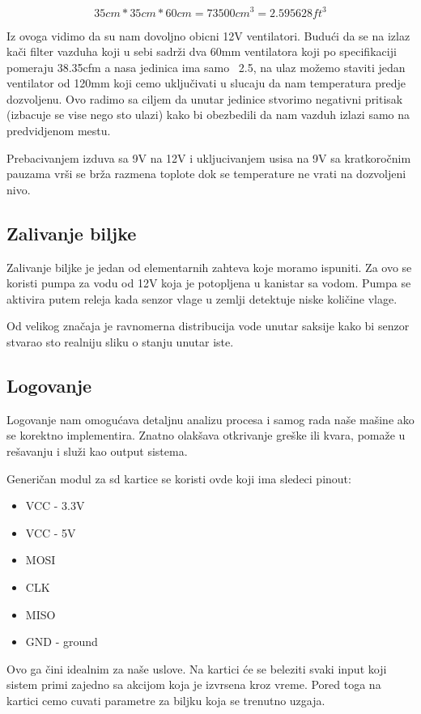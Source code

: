 \documentclass[a4paper,11pt]{book}
\begin{document}
\[ 35cm * 35cm * 60cm =  73500cm^3 = 2.595628ft^3\]

Iz ovoga vidimo da su nam dovoljno obicni 12V ventilatori. Budući da se na izlaz kači filter vazduha koji u sebi sadrži dva 60mm ventilatora koji po specifikaciji pomeraju 38.35cfm a nasa jedinica ima samo ~2.5, na ulaz možemo staviti jedan ventilator od 120mm koji cemo uključivati u slucaju da nam temperatura predje dozvoljenu. Ovo radimo sa ciljem da unutar jedinice stvorimo negativni pritisak (izbacuje se vise nego sto ulazi) kako bi obezbedili da nam vazduh izlazi samo na predvidjenom mestu.

\noindent Prebacivanjem izduva sa 9V na 12V i ukljucivanjem usisa na 9V sa kratkoročnim pauzama vrši se brža razmena toplote dok se temperature ne vrati na dozvoljeni nivo. 

\subsection{Zalivanje biljke}
Zalivanje biljke je jedan od elementarnih zahteva koje moramo ispuniti. Za ovo se koristi pumpa za vodu od 12V koja je potopljena u kanistar sa vodom. Pumpa se aktivira putem releja kada senzor vlage u zemlji detektuje niske količine vlage.

\noindent Od velikog značaja je ravnomerna distribucija vode unutar saksije kako bi senzor stvarao sto realniju sliku o stanju unutar iste.

\subsection{Logovanje}
Logovanje nam omogućava detaljnu analizu procesa i samog rada naše mašine ako se korektno implementira. Znatno olakšava otkrivanje greške ili kvara, pomaže u rešavanju i služi kao output sistema.

Generičan modul za sd kartice se koristi ovde koji ima sledeci pinout:

\hrulefill
\begin{itemize}
  \item VCC - 3.3V
  \item VCC - 5V
  \item MOSI
  \item CLK 
  \item MISO
  \item GND - ground
\end{itemize}
\hrulefill

Ovo ga čini idealnim za naše uslove. Na kartici će se beleziti svaki input koji sistem primi zajedno sa akcijom koja je izvrsena kroz vreme. Pored toga na kartici cemo cuvati parametre za biljku koja se trenutno uzgaja.
\end{document}
